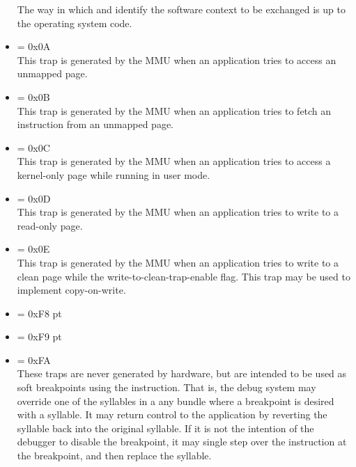 \begin{itemize}
The way in which  and  identify the software context to be
exchanged is up to the operating system code.

\setcounter{enumi}{9}
\item {} \label{trap:DMEM_PAGE_FAULT}  = 0x0A
\\[6 pt]
This trap is generated by the MMU when an application tries to access an
unmapped page.

\setcounter{enumi}{10}
\item {} \label{trap:IMEM_PAGE_FAULT}  = 0x0B
\\[6 pt]
This trap is generated by the MMU when an application tries to fetch an
instruction from an unmapped page.

\setcounter{enumi}{11}
\item {} \label{trap:KERNEL_SPACE_VIO}  = 0x0C
\\[6 pt]
This trap is generated by the MMU when an application tries to access a
kernel-only page while running in user mode.

\setcounter{enumi}{12}
\item {} \label{trap:WRITE_ACCESS_VIO}  = 0x0D
\\[6 pt]
This trap is generated by the MMU when an application tries to write to a
read-only page.

\setcounter{enumi}{13}
\item {} \label{trap:WRITE_TO_CLEAN_PAGE}  = 0x0E
\\[6 pt]
This trap is generated by the MMU when an application tries to write to a clean
page while the write-to-clean-trap-enable flag.
 This trap may be used to
implement copy-on-write.

\setcounter{enumi}{247}
\item {} \label{trap:SOFT_DEBUG_0}  = 0xF8
 pt\relax
\item {} \label{trap:SOFT_DEBUG_1}  = 0xF9
 pt\relax
\item {} \label{trap:SOFT_DEBUG_2}  = 0xFA
\\[6 pt]
These traps are never generated by hardware, but are intended to be used as soft
breakpoints using the  instruction. That is, the debug system may
override one of the syllables in a any bundle where a breakpoint is desired with
a  syllable. It may return control to the application by reverting
the  syllable back into the original syllable. If it is not the
intention of the debugger to disable the breakpoint, it may single step over
the instruction at the breakpoint, and then replace the  syllable.


\end{itemize}
